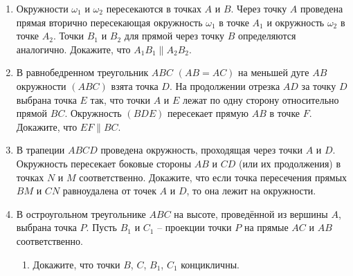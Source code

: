 \begin{enumerate}
    \item {}\label{lem:fuss}{Окружности $\omega_1$ и $\omega_2$ пересекаются в точках $A$ и $B$. Через точку $A$ проведена прямая вторично пересекающая окружность $\omega_1$ в точке $A_1$ и окружность $\omega_2$ в точке $A_2$. Точки $B_1$ и $B_2$ для прямой через точку $B$ определяются аналогично. Докажите, что $A_1B_1 \parallel A_2B_2$.}   
    

    \item В равнобедренном треугольник $ABC$ $(AB=AC)$ на меньшей дуге $AB$ окружности $(ABC)$ взята точка $D$. На продолжении отрезка $AD$ за точку $D$ выбрана точка $E$ так, что точки $A$ и $E$ лежат по одну сторону относительно прямой $BC$. Окружность $(BDE)$ пересекает прямую $AB$ в точке $F$. Докажите, что $EF \parallel BC$.

    

    \item В трапеции $ABCD$ проведена окружность, проходящая через точки $A$ и $D$. Окружность пересекает боковые стороны $AB$ и $CD$ (или их продолжения) в точках $N$ и $M$ соответственно. Докажите, что если точка пересечения прямых $BM$ и $CN$ равноудалена от точек $A$ и $D$, то она лежит на окружности. 

    
    \item В остроугольном треугольнике $ABC$ на высоте, проведённой из вершины $A$, выбрана точка $P$. Пусть $B_1$ и $C_1$ -- проекции точки $P$ на прямые $AC$ и $AB$ соответственно. 
    \begin{enumerate}
        \item Докажите, что точки $B$, $C$, $B_1$, $C_1$ концикличны. \label{lem:projections}
        

\end{enumerate}
\end{enumerate}
